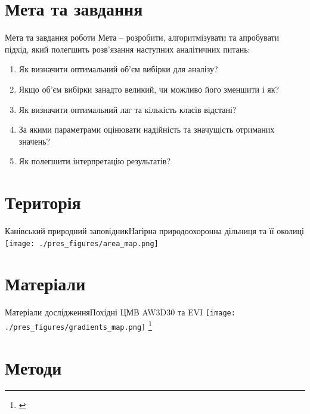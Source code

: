 \documentclass[]{beamer}
\newcommand\blfootnote[1]{%
	\begingroup
	\renewcommand\thefootnote{}\footnote{#1}%
	\addtocounter{footnote}{-1}%
	\endgroup
}
\begin{document}
\section{Мета та завдання}
\begin{frame}{Мета та завдання роботи}{}
\textcolor{MyBlue}{Мета} -- розробити, алгоритмізувати та апробувати підхід, який полегшить розв'язання наступних аналітичних питань:
	\begin{enumerate}
		\item Як визначити оптимальний об'єм вибірки для аналізу?
		\item Якщо об'єм вибірки занадто великий, чи можливо його зменшити і як?
		\item Як визначити оптимальний лаг та кількість класів відстані?
		\item За якими параметрами оцінювати надійність та значущість отриманих значень?
		\item Як полегшити інтерпретацію результатів?		
    \end{enumerate}
\end{frame}

\section{Територія}
\begin{frame}{Канівський природний заповідник}{Нагірна природоохоронна дільниця та її околиці}
\texttt{[image: ./pres\_figures/area\_map.png]}
\end{frame}

\section{Матеріали}
\begin{frame}{Матеріали дослідження}{Похідні ЦМВ AW3D30 та EVI}
\texttt{[image: ./pres\_figures/gradients\_map.png]}
\blfootnote{\tiny{\cites{Conrad2015}{EorcJaxa2017}{Lecours2017}{Vermote2016}}}
\end{frame}

\section{Методи}
\end{document}
